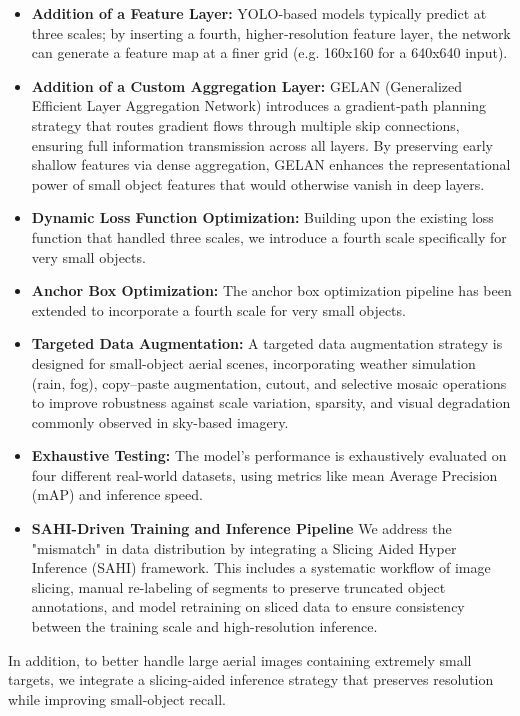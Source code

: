 \documentclass[preprint,review,12pt]{elsarticle}
\begin{document}
\begin{itemize}
    
    \item   \textbf{Addition of a Feature Layer:} 
     YOLO‑based models typically predict at three scales; by inserting a fourth, higher‑resolution feature layer, the network can generate a feature map at a finer grid (e.g. 160x160 for a 640x640 input).
    \item \textbf{Addition of a Custom Aggregation Layer:} 
    GELAN (Generalized Efficient Layer Aggregation Network) introduces a gradient‑path planning strategy that routes gradient flows through multiple skip connections, ensuring full information transmission across all layers. By preserving early shallow features via dense aggregation, GELAN enhances the representational power of small object features that would otherwise vanish in deep layers.
    \item \textbf{Dynamic Loss Function Optimization:} 
    Building upon the existing loss function that handled three scales, we introduce a fourth scale specifically for very small objects. 
   \item \textbf{Anchor Box Optimization:} 
    The anchor box optimization pipeline has been extended to incorporate a fourth scale for very small objects. 
   \item \textbf{Targeted Data Augmentation:}
   A targeted data augmentation strategy is designed for small-object aerial scenes, incorporating weather simulation (rain, fog), copy–paste augmentation, cutout, and selective mosaic operations to improve robustness against scale variation, sparsity, and visual degradation commonly observed in sky-based imagery.
    
    \item \textbf{Exhaustive Testing:}
    The model’s performance is exhaustively evaluated on four different real-world datasets, using metrics like mean Average Precision (mAP) and inference speed.

     \item \textbf{SAHI-Driven Training and Inference Pipeline} We address the "mismatch" in data distribution by integrating a Slicing Aided Hyper Inference (SAHI) framework. This includes a systematic workflow of image slicing, manual re-labeling of segments to preserve truncated object annotations, and model retraining on sliced data to ensure consistency between the training scale and high-resolution inference.
    
\end{itemize}
In addition, to better handle large aerial images containing extremely small targets, we integrate a slicing-aided inference strategy that preserves resolution while improving small-object recall.
\end{document}
